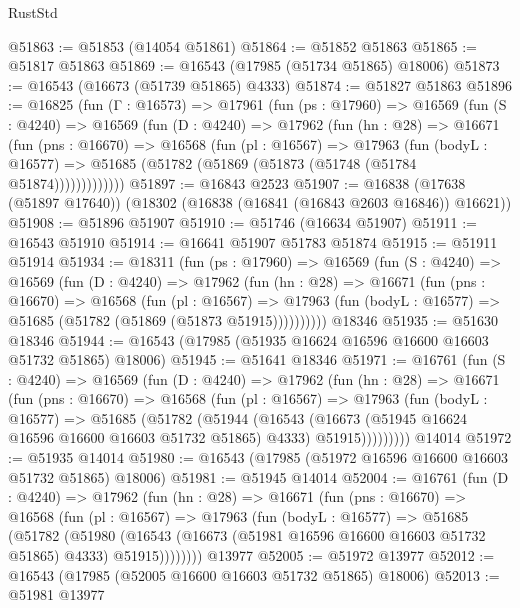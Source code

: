 \begin{lexlean}{RustStd}
\begin{coremodule}
@51863 := @51853 (@14054 @51861)
@51864 := @51852 @51863
@51865 := @51817 @51863
@51869 := @16543 (@17985 (@51734 @51865) @18006)
@51873 := @16543 (@16673 (@51739 @51865) @4333)
@51874 := @51827 @51863
@51896 := @16825
    (fun (Γ : @16573) =>
    @17961
      (fun (ps : @17960) =>
      @16569
        (fun (S : @4240) =>
        @16569
          (fun (D : @4240) =>
          @17962
            (fun (hn : @28) =>
            @16671
              (fun (pns : @16670) =>
              @16568
                (fun (pl : @16567) =>
                @17963
                  (fun (bodyL : @16577) =>
                  @51685 (@51782 (@51869 (@51873 (@51748 (@51784 @51874)))))))))))))
@51897 := @16843 @2523
@51907 := @16838 (@17638 (@51897 @17640)) (@18302 (@16838 (@16841 (@16843 @2603 @16846)) @16621))
@51908 := @51896 @51907
@51910 := @51746 (@16634 @51907)
@51911 := @16543 @51910
@51914 := @16641 @51907 @51783 @51874
@51915 := @51911 @51914
@51934 := @18311
    (fun (ps : @17960) =>
    @16569
      (fun (S : @4240) =>
      @16569
        (fun (D : @4240) =>
        @17962
          (fun (hn : @28) =>
          @16671
            (fun (pns : @16670) =>
            @16568
              (fun (pl : @16567) =>
              @17963 (fun (bodyL : @16577) => @51685 (@51782 (@51869 (@51873 @51915))))))))))
    @18346
@51935 := @51630 @18346
@51944 := @16543 (@17985 (@51935 @16624 @16596 @16600 @16603 @51732 @51865) @18006)
@51945 := @51641 @18346
@51971 := @16761
    (fun (S : @4240) =>
    @16569
      (fun (D : @4240) =>
      @17962
        (fun (hn : @28) =>
        @16671
          (fun (pns : @16670) =>
          @16568
            (fun (pl : @16567) =>
            @17963
              (fun (bodyL : @16577) =>
              @51685
                (@51782
                  (@51944
                    (@16543
                      (@16673 (@51945 @16624 @16596 @16600 @16603 @51732 @51865) @4333)
                      @51915)))))))))
    @14014
@51972 := @51935 @14014
@51980 := @16543 (@17985 (@51972 @16596 @16600 @16603 @51732 @51865) @18006)
@51981 := @51945 @14014
@52004 := @16761
    (fun (D : @4240) =>
    @17962
      (fun (hn : @28) =>
      @16671
        (fun (pns : @16670) =>
        @16568
          (fun (pl : @16567) =>
          @17963
            (fun (bodyL : @16577) =>
            @51685
              (@51782
                (@51980
                  (@16543 (@16673 (@51981 @16596 @16600 @16603 @51732 @51865) @4333) @51915))))))))
    @13977
@52005 := @51972 @13977
@52012 := @16543 (@17985 (@52005 @16600 @16603 @51732 @51865) @18006)
@52013 := @51981 @13977

\end{coremodule}
\end{lexlean}
